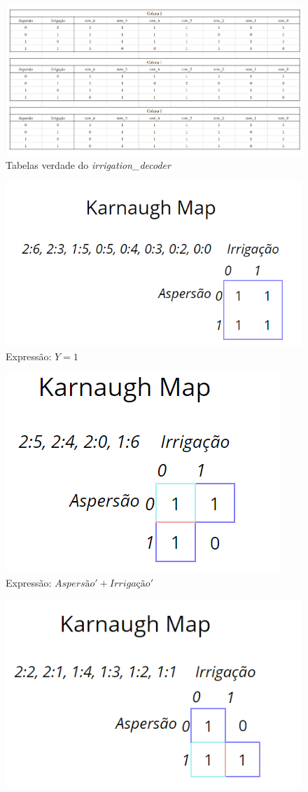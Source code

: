 \documentclass[
	article,			%
	11pt,				%
	oneside,			%
	a4paper,			%
	english,			%
	brazil,				%
	sumario=tradicional
	]{abntex2}
\begin{document}
\begin{itemize}
\begin{figure}[H]
    \centering
    \includegraphics[width=0.9\linewidth]{irrigation_decoder.png}
    \caption{Tabelas verdade do \textit{irrigation\_decoder}}
    \label{fig:irrigation_decoder}
\end{figure}
\begin{figure}[H]
    \centering
    \includegraphics[width=0.5\linewidth]{irrigation-1111.png}
    \caption{Expressão: $Y = 1$}
    \label{fig:irrigation-1111}
\end{figure}
\begin{figure}[H]
    \centering
    \includegraphics[width=0.4\linewidth]{kmap1110e.png}
    \caption{Expressão: $Aspersão' + Irrigação'$}
    \label{fig:irrigation-1110}
\end{figure}
\begin{figure}[H]
    \centering
    \includegraphics[width=0.45\linewidth]{irrigation-kmap1011ge.png}

\end{figure}
\end{itemize}
\end{document}

